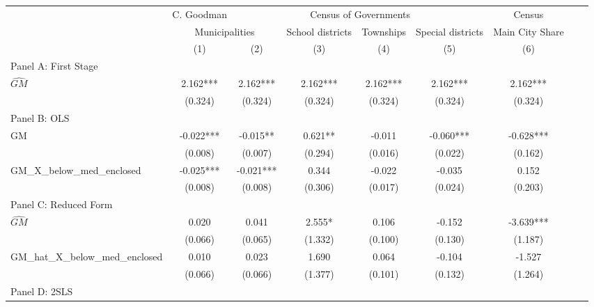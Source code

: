  \begin{tabular}{l*{8}{c}} \toprule
&\multicolumn{1}{c}{C. Goodman}&\multicolumn{4}{c}{Census of Governments}&\multicolumn{1}{c}{Census}\\\cmidrule(lr){2-2}\cmidrule(lr){3-6}\cmidrule(lr){7-7}
&\multicolumn{2}{c}{Municipalities}&\multicolumn{1}{c}{School districts}&\multicolumn{1}{c}{Townships}&\multicolumn{1}{c}{Special districts}&\multicolumn{1}{c}{Main City Share}\\\cmidrule(lr){2-3}\cmidrule(lr){4-6}\cmidrule(lr){7-7}
&\multicolumn{1}{c}{(1)}&\multicolumn{1}{c}{(2)}&\multicolumn{1}{c}{(3)}&\multicolumn{1}{c}{(4)}&\multicolumn{1}{c}{(5)}&\multicolumn{1}{c}{(6)}\\
\cmidrule(lr){1-7}
\multicolumn{6}{l}{Panel A: First Stage}\\
\cmidrule(lr){1-7}
$\widehat{GM}$  &    2.162***&    2.162***&    2.162***&    2.162***&    2.162***&    2.162***\\
                &  (0.324)   &  (0.324)   &  (0.324)   &  (0.324)   &  (0.324)   &  (0.324)   \\
\cmidrule(lr){1-7}
\multicolumn{6}{l}{Panel B: OLS}\\
\cmidrule(lr){1-7}
GM              &   -0.022***&   -0.015** &    0.621** &   -0.011   &   -0.060***&   -0.628***\\
                &  (0.008)   &  (0.007)   &  (0.294)   &  (0.016)   &  (0.022)   &  (0.162)   \\
\addlinespace
GM\_X\_below\_med\_enclosed&   -0.025***&   -0.021***&    0.344   &   -0.022   &   -0.035   &    0.152   \\
                &  (0.008)   &  (0.008)   &  (0.306)   &  (0.017)   &  (0.024)   &  (0.203)   \\
\cmidrule(lr){1-7}
\multicolumn{6}{l}{Panel C: Reduced Form}\\
\cmidrule(lr){1-7}
$\widehat{GM}$  &    0.020   &    0.041   &    2.555*  &    0.106   &   -0.152   &   -3.639***\\
                &  (0.066)   &  (0.065)   &  (1.332)   &  (0.100)   &  (0.130)   &  (1.187)   \\
\addlinespace
GM\_hat\_X\_below\_med\_enclosed&    0.010   &    0.023   &    1.690   &    0.064   &   -0.104   &   -1.527   \\
                &  (0.066)   &  (0.066)   &  (1.377)   &  (0.101)   &  (0.132)   &  (1.264)   \\
\cmidrule(lr){1-7}
\multicolumn{6}{l}{Panel D: 2SLS}\\

\end{tabular}
